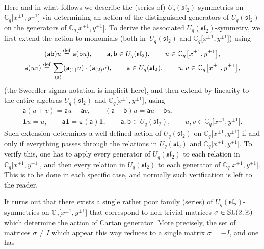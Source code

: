\documentclass[10pt,a4paper]{amsart}
\numberwithin{equation}{section}
\begin{document}
Here and in what follows we describe the (series of) $U_q(\mathfrak{sl}_2)$-symmetries on $\mathbb{C}_q\big[x^{\pm 1},y^{\pm 1}\big]$ via determining an action of the distinguished generators of $U_q(\mathfrak{sl}_2)$ on the generators of $\mathbb{C}_q\big[x^{\pm 1}{,}y^{\pm 1}\big]$. To derive the associated $U_q(\mathfrak{sl}_2)$-symmetry, we first extend the action to monomials (both in~$U_q(\mathfrak{sl}_2)$ and $\mathbb{C}_q\big[x^{\pm 1},y^{\pm 1}\big]$) using
\begin{gather*}
(\mathsf{ab})u \overset{\rm def}{=}\mathsf{a}(\mathsf{b}u), \qquad \mathsf{a},\mathsf{b} \in U_q(\mathfrak{sl}_2), \qquad u \in\mathbb{C}_q\big[x^{\pm 1},y^{\pm 1}\big],\\
 \mathsf{a}(uv) \overset{\rm def}{=} \sum_{(\mathsf{a})}(\mathsf{a}_{(1)}u)\cdot(\mathsf{a}_{(2)}v), \qquad \mathsf{a} \in U_q(\mathfrak{sl}_2), \qquad u,v \in\mathbb{C}_q\big[x^{\pm 1},y^{\pm 1}\big],
\end{gather*}
(the Sweedler sigma-notation is implicit here), and then extend by linearity to the entire algebras $U_q(\mathfrak{sl}_2)$ and $\mathbb{C}_q\big[x^{\pm 1},y^{\pm 1}\big]$, using
\begin{gather*}
\mathsf{a}(u+v)=\mathsf{a}u+\mathsf{a}v,\qquad (\mathsf{a}+\mathsf{b})u=\mathsf{a}u+\mathsf{b}u,\\
\mathbf{1}u=u,\qquad \mathsf{a}\mathbf{1}=\boldsymbol{\varepsilon}(\mathsf{a})\mathbf{1}, \qquad\mathsf{a},\mathsf{b}\in U_q(\mathfrak{sl}_2),\qquad u,v\in\mathbb{C}_q\big[x^{\pm 1},y^{\pm 1}\big].
\end{gather*}
Such extension determines a well-defined action of $U_q(\mathfrak{sl}_2)$ on $\mathbb{C}_q\big[x^{\pm 1},y^{\pm 1}\big]$ if and only if everything passes through the relations in $U_q(\mathfrak{sl}_2)$ and $\mathbb{C}_q\big[x^{\pm 1},y^{\pm 1}\big]$. To verify this, one has to apply every generator of $U_q(\mathfrak{sl}_2)$ to each relation in $\mathbb{C}_q\big[x^{\pm 1},y^{\pm 1}\big]$, and then every relation in $U_q(\mathfrak{sl}_2)$ to each generator of $\mathbb{C}_q\big[x^{\pm 1},y^{\pm 1}\big]$. This is to be done in each specific case, and normally such verification is left to the reader.

It turns out that there exists a single rather poor family (series) of $U_q(\mathfrak{sl}_2)$-symmetries on $\mathbb{C}_q\big[x^{\pm 1},y^{\pm 1}\big]$
that correspond to non-trivial matrices $\sigma\in {\rm SL}(2,\mathbb{Z})$ which determine the action of Cartan generator. More precisely, the set of matrices $\sigma\ne I$ which appear this way reduces to a single matrix $\sigma=-I$, and one has
\end{document}
